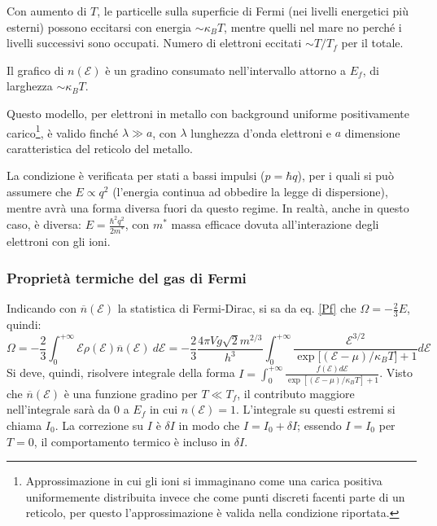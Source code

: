 \documentclass[10pt, a4paper]{scrartcl}
\numberwithin{equation}{subsection}
\theoremstyle{style1}
\theoremstyle{style2}
\begin{document}
Con aumento di $T$, le particelle sulla superficie di Fermi (nei livelli energetici pi\`u esterni) possono eccitarsi con energia $\sim \kappa _B T$, mentre quelli nel mare no perch\'e i livelli successivi sono occupati. 
Numero di elettroni eccitati $\sim T / T_f$ per il totale. 

Il grafico di $n(\mathscr{E})$ \`e un gradino consumato nell'intervallo attorno a $E_f$, di larghezza $\sim \kappa _B T$. 

Questo modello, per elettroni in metallo con background uniforme positivamente carico\footnote{Approssimazione in cui gli ioni si immaginano come una carica positiva uniformemente distribuita invece che come punti discreti facenti parte di un reticolo, per questo l'approssimazione \`e valida nella condizione riportata.}, \`e valido finch\'e $\lambda \gg a$, con $\lambda $ lunghezza d'onda elettroni e $a$ dimensione caratteristica del reticolo del metallo.

La condizione \`e verificata per stati a bassi impulsi ($p = \hbar  q$), per i quali si pu\`o assumere che $E \propto q^2$ (l'energia continua ad obbedire la legge di dispersione), mentre avr\`a una forma diversa fuori da questo regime. 
In realt\`a, anche in questo caso, \`e diversa: $E = \frac{\hbar ^2 q^2}{2m^*}$, con $m^*$ massa efficace dovuta all'interazione degli elettroni con gli ioni.

\subsubsection{Propriet\`a termiche del gas di Fermi}
Indicando con $\overline{n}(\mathscr{E})$ la statistica di Fermi-Dirac, si sa da eq. \ref{Pf} che $\Omega = -\frac{2}{3}E$, quindi:
\[
	\Omega = -\frac{2}{3} \int_{0} ^{+\infty} \mathscr{E}\rho (\mathscr{E}) \overline{n}(\mathscr{E}) \ d \mathscr{E}= -\frac{2}{3} \frac{4 \pi V g \sqrt{2} m^{2 / 3} }{h^3}\int_{0} ^{+\infty} \frac{\mathscr{E}^{3/2} }{\exp \big[(\mathscr{E}-\mu) / \kappa _BT \big] + 1} d \mathscr{E}
\] 
Si deve, quindi, risolvere integrale della forma $I = \int_{0} ^{+\infty} \frac{f(\mathscr{E}) d \mathscr{E}}{\exp\left[ (\mathscr{E}-\mu ) / \kappa _ BT \right] +1}$.
Visto che $\overline{n}(\mathscr{E})$ \`e una funzione gradino per $T \ll T_f$, il contributo maggiore nell'integrale sar\`a da $0$ a $E_f$ in cui $n(\mathscr{E}) = 1$.
L'integrale su questi estremi si chiama $I_0$. La correzione su $I$ \`e $\delta I$ in modo che $I = I_0 + \delta I$; essendo $I = I_0$ per $T=0$, il comportamento termico \`e incluso in $\delta I$.
\end{document}
